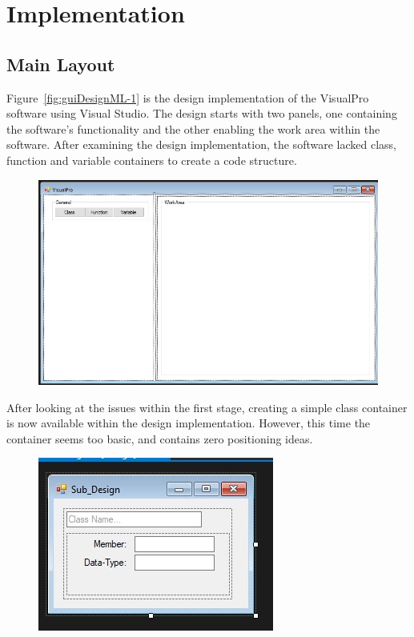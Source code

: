 \documentclass[12pt]{report} %
\begin{document}
	\chapter{Implementation}
		\section{Main Layout}
			Figure~\ref{fig:guiDesignML-1} is the design implementation of the VisualPro software using Visual Studio. The design starts with two panels, one containing the software's functionality and the other enabling the work area within the software. After examining the design implementation, the software lacked class, function and variable containers to create a code structure.
			\begin{figure}[H]
				{\includegraphics[scale=0.45]{Figures/vp-designs/NET_Framework-GUI-1.jpg}}
			\end{figure}

			After looking at the issues within the first stage, creating a simple class container is now available within the design implementation. However, this time the container seems too basic, and contains zero positioning ideas.
			\begin{figure}[H]
				{\includegraphics[scale=0.75]{Figures/vp-designs/NET_Framework-GUI-2.jpg}}
			\end{figure}
\end{document}

